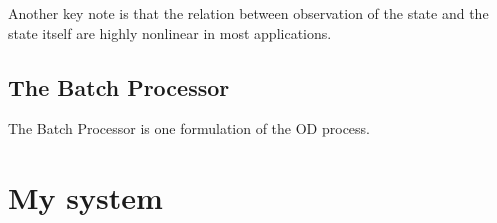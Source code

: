 \documentclass[12pt,a4paper,oneside]{article}
\begin{document}
Another key note is that the relation between observation of the state and the state itself are highly nonlinear in most applications. 

\subsection{The Batch Processor}
The Batch Processor is one formulation of the OD process. 





\section{My system}








\newpage



%
\end{document}
